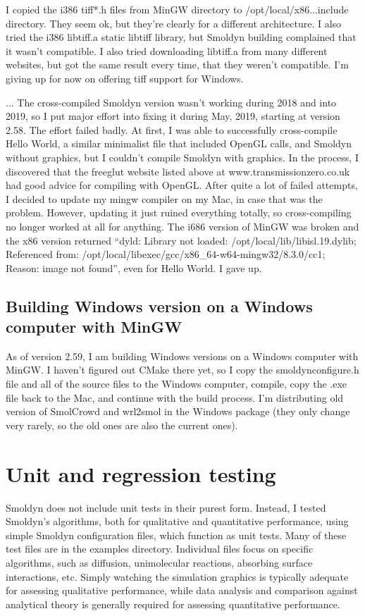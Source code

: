 \documentclass {book}
\begin{document}
I copied the i386 tiff*.h files from MinGW directory to /opt/local/x86...include directory. They seem ok, but they're clearly for a different architecture. I also tried the i386 libtiff.a static libtiff library, but Smoldyn building complained that it wasn't compatible. I also tried downloading libtiff.a from many different websites, but got the same result every time, that they weren't compatible. I'm giving up for now on offering tiff support for Windows.

... The cross-compiled Smoldyn version wasn't working during 2018 and into 2019, so I put major effort into fixing it during May, 2019, starting at version 2.58. The effort failed badly. At first, I was able to successfully cross-compile Hello World, a similar minimalist file that included OpenGL calls, and Smoldyn without graphics, but I couldn't compile Smoldyn with graphics. In the process, I discovered that the freeglut website listed above at www.transmissionzero.co.uk had good advice for compiling with OpenGL. After quite a lot of failed attempts, I decided to update my mingw compiler on my Mac, in case that was the problem. However, updating it just ruined everything totally, so cross-compiling no longer worked at all for anything. The i686 version of MinGW was broken and the x86 version returned ``dyld: Library not loaded: /opt/local/lib/libisl.19.dylib; Referenced from: /opt/local/libexec/gcc/x86\_64-w64-mingw32/8.3.0/cc1; Reason: image not found'', even for Hello World. I gave up.

\subsection{Building Windows version on a Windows computer with MinGW}

As of version 2.59, I am building Windows versions on a Windows computer with MinGW. I haven't figured out CMake there yet, so I copy the smoldynconfigure.h file and all of the source files to the Windows computer, compile, copy the .exe file back to the Mac, and continue with the build process. I'm distributing old version of SmolCrowd and wrl2smol in the Windows package (they only change very rarely, so the old ones are also the current ones).

\section{Unit and regression testing}

Smoldyn does not include unit tests in their purest form.  Instead, I tested Smoldyn's algorithms, both for qualitative and quantitative performance, using simple Smoldyn configuration files, which function as unit tests.  Many of these test files are in the examples directory.  Individual files focus on specific algorithms, such as diffusion, unimolecular reactions, absorbing surface interactions, etc.  Simply watching the simulation graphics is typically adequate for assessing qualitative performance, while data analysis and comparison against analytical theory is generally required for assessing quantitative performance.
\end{document}
